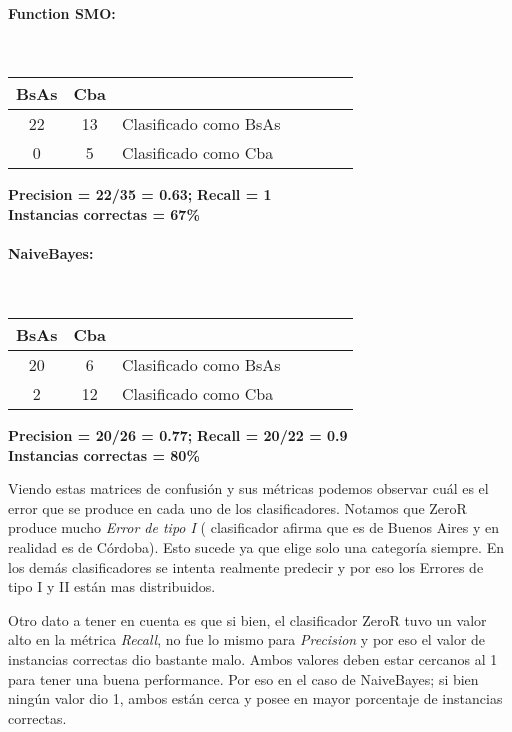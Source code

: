 \paragraph*{Function SMO:}\mbox{}\\
\begin{table}[H]
\centering
\begin{tabular}{|c|c|l|c|c|c|c|}
\hline
 BsAs & Cba &  \\ \hline
 22 &  13 &  Clasificado como BsAs \\ \hline
 0  &   5 &  Clasificado como Cba \\ \hline
\end{tabular}
\end{table}
\begin{center}
\textbf{Precision = 22/35 = 0.63;} \textbf{Recall = 1}\\
\textbf{Instancias correctas = 67\%}
\end{center}

\paragraph*{NaiveBayes:}\mbox{}\\
\begin{table}[H]
\centering
\begin{tabular}{|c|c|l|c|c|c|c|}
\hline
 BsAs & Cba &  \\ \hline
 20 &  6 &  Clasificado como BsAs \\ \hline
 2  &  12 &  Clasificado como Cba \\ \hline
\end{tabular}
\end{table}
\begin{center}
\textbf{Precision = 20/26 = 0.77;} \textbf{Recall = 20/22 = 0.9}\\
\textbf{Instancias correctas = 80\%}
\end{center}

Viendo estas matrices de confusión y sus métricas podemos observar cuál es el error que se produce en cada uno de los clasificadores. Notamos que ZeroR produce mucho \textit{Error de tipo I} ( clasificador afirma que es de Buenos Aires y en realidad es de Córdoba). Esto sucede ya que elige solo una categoría siempre. En los demás clasificadores se intenta realmente predecir y por eso los Errores de tipo I y II están mas distribuidos.

Otro dato a tener en cuenta es que si bien, el clasificador ZeroR tuvo un valor alto en la métrica \textit{Recall}, no fue lo mismo para \textit{Precision} y por eso el valor de instancias correctas dio bastante malo. Ambos valores deben estar cercanos al 1 para tener una buena performance. Por eso en el caso de NaiveBayes; si bien ningún valor dio 1, ambos están cerca y posee en mayor porcentaje de instancias correctas.

